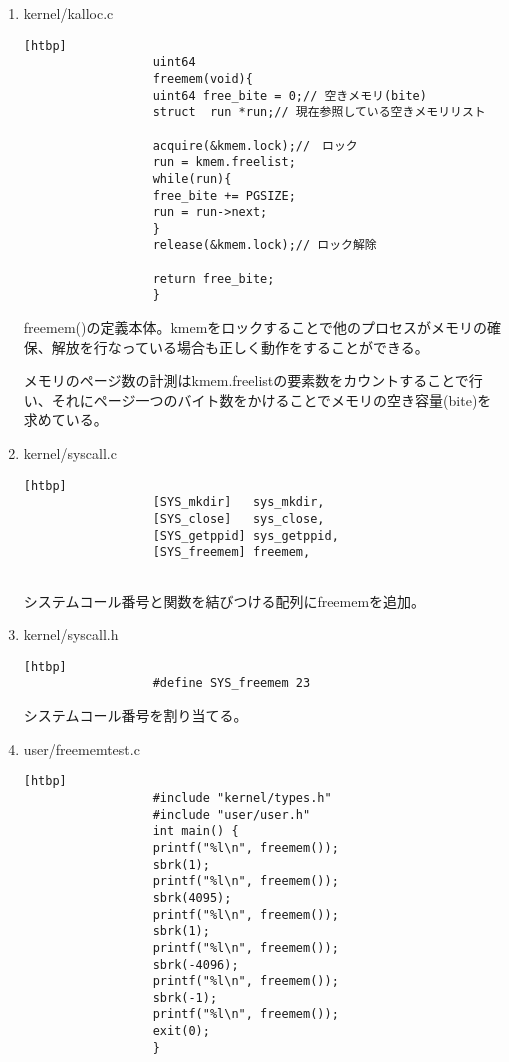 \documentclass[a4j,12pt]{jreport}
\begin{document}
\begin{enumerate}

      \item kernel/kalloc.c
            \begin{lstlisting}[basicstyle=\ttfamily\footnotesize, firstnumber=0][htbp]
                  uint64
                  freemem(void){
                  uint64 free_bite = 0;// 空きメモリ(bite)
                  struct  run *run;// 現在参照している空きメモリリスト
                  
                  acquire(&kmem.lock);//　ロック
                  run = kmem.freelist;
                  while(run){
                  free_bite += PGSIZE;
                  run = run->next;
                  }
                  release(&kmem.lock);// ロック解除
                  
                  return free_bite;
                  }
            \end{lstlisting}

            freemem()の定義本体。kmemをロックすることで他のプロセスがメモリの確保、解放を行なっている場合も正しく動作をすることができる。

            メモリのページ数の計測はkmem.freelistの要素数をカウントすることで行い、それにページ一つのバイト数をかけることでメモリの空き容量(bite)を求めている。

      \item kernel/syscall.c
            \begin{lstlisting}[basicstyle=\ttfamily\footnotesize, firstnumber=0][htbp]
                  [SYS_mkdir]   sys_mkdir,
                  [SYS_close]   sys_close,
                  [SYS_getppid] sys_getppid,
                  [SYS_freemem] freemem,
                  
            \end{lstlisting}

            システムコール番号と関数を結びつける配列にfreememを追加。

      \item kernel/syscall.h
            \begin{lstlisting}[basicstyle=\ttfamily\footnotesize, firstnumber=0][htbp]
                  #define SYS_freemem 23
            \end{lstlisting}

            システムコール番号を割り当てる。

      \item user/freememtest.c
            \begin{lstlisting}[basicstyle=\ttfamily\footnotesize, firstnumber=0][htbp]
                  #include "kernel/types.h"
                  #include "user/user.h"
                  int main() {
                  printf("%l\n", freemem()); 
                  sbrk(1);
                  printf("%l\n", freemem()); 
                  sbrk(4095);
                  printf("%l\n", freemem()); 
                  sbrk(1);
                  printf("%l\n", freemem()); 
                  sbrk(-4096); 
                  printf("%l\n", freemem());
                  sbrk(-1);
                  printf("%l\n", freemem()); 
                  exit(0);
                  }
            \end{lstlisting}


\end{enumerate}
\end{document}
